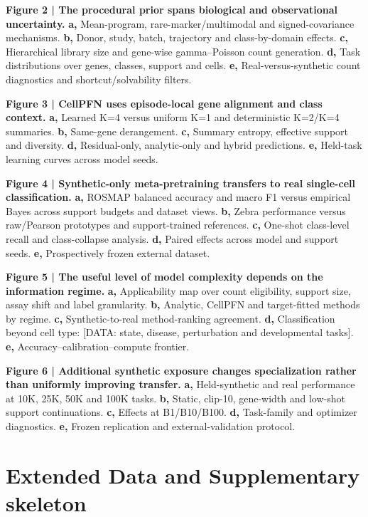 \documentclass[12pt]{article}
\newcommand{\dataplaceholder}[1]{\textcolor{purple!70!black}{[DATA: #1]}}
\begin{document}
\textbf{Figure 2 | The procedural prior spans biological and observational uncertainty.}
\textbf{a,} Mean-program, rare-marker/multimodal and signed-covariance mechanisms. \textbf{b,} Donor, study, batch, trajectory and class-by-domain effects. \textbf{c,} Hierarchical library size and gene-wise gamma--Poisson count generation. \textbf{d,} Task distributions over genes, classes, support and cells. \textbf{e,} Real-versus-synthetic count diagnostics and shortcut/solvability filters.

\textbf{Figure 3 | CellPFN uses episode-local gene alignment and class context.}
\textbf{a,} Learned K=4 versus uniform K=1 and deterministic K=2/K=4 summaries. \textbf{b,} Same-gene derangement. \textbf{c,} Summary entropy, effective support and diversity. \textbf{d,} Residual-only, analytic-only and hybrid predictions. \textbf{e,} Held-task learning curves across model seeds.

\textbf{Figure 4 | Synthetic-only meta-pretraining transfers to real single-cell classification.}
\textbf{a,} ROSMAP balanced accuracy and macro F1 versus empirical Bayes across support budgets and dataset views. \textbf{b,} Zebra performance versus raw/Pearson prototypes and support-trained references. \textbf{c,} One-shot class-level recall and class-collapse analysis. \textbf{d,} Paired effects across model and support seeds. \textbf{e,} Prospectively frozen external dataset.

\textbf{Figure 5 | The useful level of model complexity depends on the information regime.}
\textbf{a,} Applicability map over count eligibility, support size, assay shift and label granularity. \textbf{b,} Analytic, CellPFN and target-fitted methods by regime. \textbf{c,} Synthetic-to-real method-ranking agreement. \textbf{d,} Classification beyond cell type: \dataplaceholder{state, disease, perturbation and developmental tasks}. \textbf{e,} Accuracy--calibration--compute frontier.

\textbf{Figure 6 | Additional synthetic exposure changes specialization rather than uniformly improving transfer.}
\textbf{a,} Held-synthetic and real performance at 10K, 25K, 50K and 100K tasks. \textbf{b,} Static, clip-10, gene-width and low-shot support continuations. \textbf{c,} Effects at B1/B10/B100. \textbf{d,} Task-family and optimizer diagnostics. \textbf{e,} Frozen replication and external-validation protocol.

\clearpage
\section*{Extended Data and Supplementary skeleton}
\end{document}
